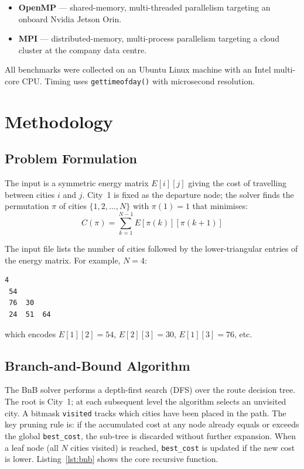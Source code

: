\documentclass[conference]{IEEEtran}
\begin{document}
\begin{itemize}
  \item \textbf{OpenMP} --- shared-memory, multi-threaded parallelism
        targeting an onboard Nvidia Jetson Orin.
  \item \textbf{MPI} --- distributed-memory, multi-process parallelism
        targeting a cloud cluster at the company data centre.
\end{itemize}

All benchmarks were collected on an Ubuntu Linux machine with an Intel
multi-core CPU. Timing uses \texttt{gettimeofday()} with microsecond
resolution.

\section{Methodology}

\subsection{Problem Formulation}

The input is a symmetric energy matrix $E[i][j]$ giving the cost of travelling
between cities $i$ and $j$.
City~1 is fixed as the departure node; the solver finds the permutation
$\pi$ of cities $\{1, 2, \ldots, N\}$ with $\pi(1) = 1$ that minimises:
\begin{equation}
  C(\pi) = \sum_{k=1}^{N-1} E[\pi(k)][\pi(k{+}1)]
\end{equation}

The input file lists the number of cities followed by the lower-triangular
entries of the energy matrix. For example, $N{=}4$:
\begin{lstlisting}[numbers=none]
4
 54
 76  30
 24  51  64
\end{lstlisting}
which encodes $E[1][2]{=}54$, $E[2][3]{=}30$, $E[1][3]{=}76$, etc.

\subsection{Branch-and-Bound Algorithm}

The BnB solver performs a depth-first search (DFS) over the route decision
tree. The root is City~1; at each subsequent level the algorithm selects an
unvisited city. A bitmask \texttt{visited} tracks which cities have been placed
in the path. The key pruning rule is: if the accumulated cost at any node
already equals or exceeds the global \texttt{best\_cost}, the sub-tree is
discarded without further expansion. When a leaf node (all $N$ cities
visited) is reached, \texttt{best\_cost} is updated if the new cost is lower.
Listing~\ref{lst:bnb} shows the core recursive function.
\end{document}

